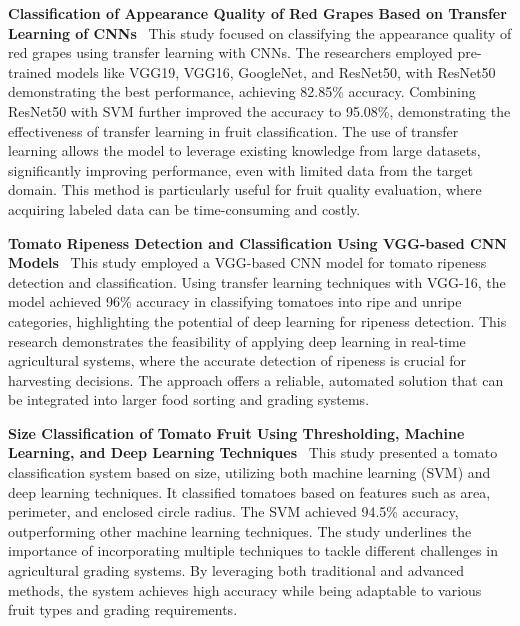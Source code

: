 \documentclass[12pt,a4paper]{report}
\begin{document}
	\vspace*{0.8cm} \textbf{Classification of Appearance Quality of Red Grapes Based on Transfer Learning of CNNs} \ This study focused on classifying the appearance quality of red grapes using transfer learning with CNNs. The researchers employed pre-trained models like VGG19, VGG16, GoogleNet, and ResNet50, with ResNet50 demonstrating the best performance, achieving 82.85\% accuracy. Combining ResNet50 with SVM further improved the accuracy to 95.08\%, demonstrating the effectiveness of transfer learning in fruit classification. The use of transfer learning allows the model to leverage existing knowledge from large datasets, significantly improving performance, even with limited data from the target domain. This method is particularly useful for fruit quality evaluation, where acquiring labeled data can be time-consuming and costly\cite{ref4}.
	
	\vspace*{0.8cm} \textbf{Tomato Ripeness Detection and Classification Using VGG-based CNN Models} \ This study employed a VGG-based CNN model for tomato ripeness detection and classification. Using transfer learning techniques with VGG-16, the model achieved 96\% accuracy in classifying tomatoes into ripe and unripe categories, highlighting the potential of deep learning for ripeness detection. This research demonstrates the feasibility of applying deep learning in real-time agricultural systems, where the accurate detection of ripeness is crucial for harvesting decisions. The approach offers a reliable, automated solution that can be integrated into larger food sorting and grading systems\cite{ref5}.
	
	\vspace*{0.8cm} \textbf{Size Classification of Tomato Fruit Using Thresholding, Machine Learning, and Deep Learning Techniques} \ This study presented a tomato classification system based on size, utilizing both machine learning (SVM) and deep learning techniques. It classified tomatoes based on features such as area, perimeter, and enclosed circle radius. The SVM achieved 94.5\% accuracy, outperforming other machine learning techniques. The study underlines the importance of incorporating multiple techniques to tackle different challenges in agricultural grading systems. By leveraging both traditional and advanced methods, the system achieves high accuracy while being adaptable to various fruit types and grading requirements\cite{ref6}.
	
\end{document}

